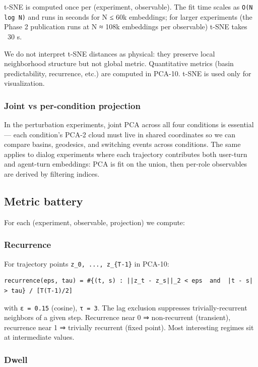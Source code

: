 \documentclass{article}
\theoremstyle{plain}
\theoremstyle{definition}
\begin{document}
t-SNE is computed once per (experiment, observable). The fit time
scales as \texttt{O(N log N)} and runs in seconds for N ≤ 60k embeddings; for
larger experiments (the Phase 2 publication runs at N ≈ 108k embeddings
per observable) t-SNE takes ~30 s.

We do not interpret t-SNE distances as physical: they preserve local
neighborhood structure but not global metric. Quantitative metrics
(basin predictability, recurrence, etc.) are computed in PCA-10. t-SNE
is used only for visualization.

\subsubsection{Joint vs per-condition projection}

In the perturbation experiments, joint PCA across all four conditions
is essential — each condition's PCA-2 cloud must live in shared
coordinates so we can compare basins, geodesics, and switching events
across conditions. The same applies to dialog experiments where each
trajectory contributes both user-turn and agent-turn embeddings: PCA
is fit on the union, then per-role observables are derived by filtering
indices.

\subsection{Metric battery}

For each (experiment, observable, projection) we compute:

\subsubsection{Recurrence}

For trajectory points \texttt{z\_0, ..., z\_\{T-1\}} in PCA-10:

\begin{verbatim}
recurrence(eps, tau) = #{(t, s) : ||z_t - z_s||_2 < eps  and  |t - s| > tau} / [T(T-1)/2]
\end{verbatim}

with \texttt{ε = 0.15} (cosine), \texttt{τ = 3}. The lag exclusion suppresses
trivially-recurrent neighbors of a given step. Recurrence near 0 ⇒
non-recurrent (transient), recurrence near 1 ⇒ trivially recurrent
(fixed point). Most interesting regimes sit at intermediate values.

\subsubsection{Dwell}
\end{document}
